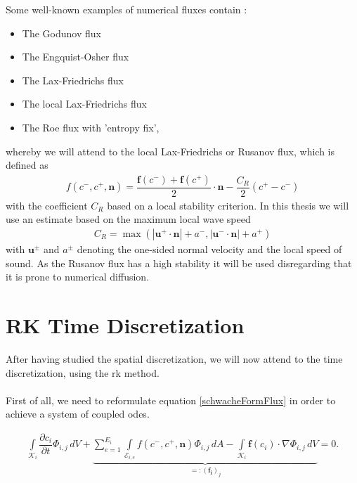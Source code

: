 		Some well-known examples of numerical fluxes contain \cite{Cockburn1998}:
		\begin{itemize}
			\item The Godunov flux 
			\item The Engquist-Osher flux
			\item The Lax-Friedrichs flux
			\item The local Lax-Friedrichs flux
			\item The Roe flux with 'entropy fix',
		\end{itemize}
		whereby we will attend to the local Lax-Friedrichs or Rusanov flux, which is defined as
		\begin{align}
			f(c^-, c^+, \mathbf{n}) = \dfrac{\mathbf{f}(c^-)+\mathbf{f}(c^+)}{2} \cdot \mathbf{n} -\dfrac{C_R}{2}(c^+-c^-)
		\end{align}
		with the coefficient $C_R$ based on a local stability criterion. In this thesis we will use an estimate based on the maximum local wave speed 
		\begin{align}
			C_R = \max(|\mathbf{u^+}\cdot \mathbf{n}|+a^-,|\mathbf{u^-}\cdot \mathbf{n}|+a^+)
		\end{align}
		with $\mathbf{u^\pm}$ and $a^\pm$ denoting the one-sided normal velocity and the local speed of sound.
		As the Rusanov flux has a high stability it will be used disregarding that it is prone to numerical diffusion.
		
	\section{RK Time Discretization}
	After having studied the spatial discretization, we will now attend to the time discretization, using the \gls{rk} method.\\\\

	First of all, we need to reformulate equation \eqref{schwacheFormFlux} in order to achieve a system of coupled \gls{ode}s.
	
	\begin{align*}
		\int\limits_{\mathcal{K}_i} \dfrac{\partial c_i}{\partial t}\Phi_{i,j} \, dV +
		\underbrace{\sum_{e=1}^{E_i}\int\limits_{\mathcal{E}_{i,e}} f \left( c^-, c^+, \mathbf{n} \right) \Phi_{i,j} \, dA - \int\limits_{\mathcal{K}_i} \boldsymbol{f}\left(c_i\right) \cdot \nabla\Phi_{i,j} \, dV}_{=:(\mathbf{f_i})_j} = 0.
	\end{align*}
	
